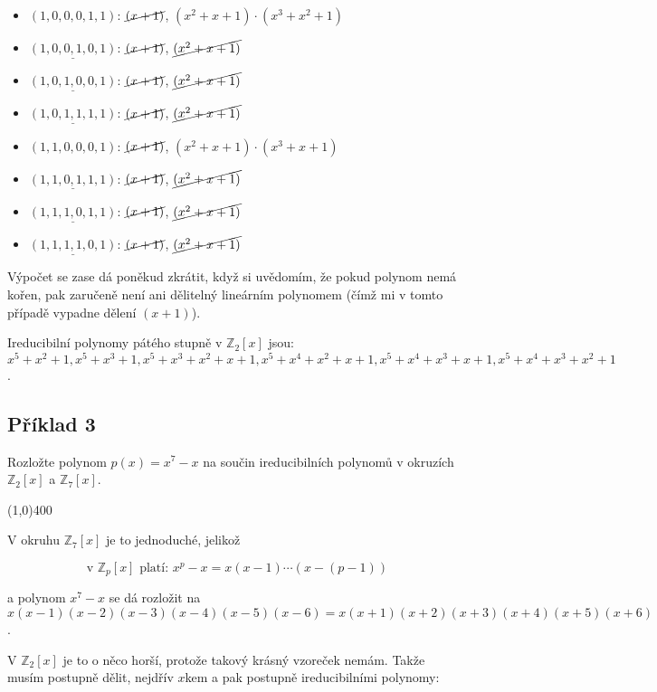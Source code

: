 \documentclass{article}
\begin{document}
\begin{itemize}
	\item $(1,0,0,0,1,1)$: $\cancel{(x+1)}$, $(x^2 + x + 1)\cdot(x^3 + x^2 + 1)$ 
	\item $\underline{(1,0,0,1,0,1)}$: $\cancel{(x+1)}$, $\cancel{(x^2 + x + 1)}$ 
	\item $\underline{(1,0,1,0,0,1)}$: $\cancel{(x+1)}$, $\cancel{(x^2 + x + 1)}$ 
	\item $\underline{(1,0,1,1,1,1)}$: $\cancel{(x+1)}$, $\cancel{(x^2 + x + 1)}$  
	\item $(1,1,0,0,0,1)$: $\cancel{(x+1)}$, $(x^2 + x + 1)\cdot(x^3 + x + 1)$ 
	\item $\underline{(1,1,0,1,1,1)}$: $\cancel{(x+1)}$, $\cancel{(x^2 + x + 1)}$  
	\item $\underline{(1,1,1,0,1,1)}$: $\cancel{(x+1)}$, $\cancel{(x^2 + x + 1)}$
	\item $\underline{(1,1,1,1,0,1)}$: $\cancel{(x+1)}$, $\cancel{(x^2 + x + 1)}$
\end{itemize}

Výpočet se zase dá poněkud zkrátit, když si uvědomím, že pokud polynom nemá kořen, pak zaručeně není ani dělitelný lineárním polynomem (čímž mi v tomto případě vypadne dělení $(x+1)$).

Ireducibilní polynomy pátého stupně v $\mathbb{Z}_2[x]$ jsou: $x^5 + x^2 + 1, x^5 + x^3 + 1, x^5 + x^3 + x^2 + x + 1, x^5 + x^4 + x^2 + x + 1, x^5 + x^4 + x^3  + x + 1, x^5 + x^4 + x^3 + x^2 + 1$.

\subsection{Příklad 3}
Rozložte polynom $p(x) = x^7 - x$ na součin ireducibilních polynomů v okruzích $\mathbb{Z}_2[x]$ a $\mathbb{Z}_7[x]$.

\line(1,0){400}

V okruhu $\mathbb{Z}_7[x]$ je to jednoduché, jelikož

\[ \mbox{ v } \mathbb{Z}_p[x]\mbox{ platí: } x^p - x = x (x-1) \cdots (x - (p-1)) \]

a polynom  $x^7 - x$ se dá rozložit na $x(x-1)(x-2)(x-3)(x-4)(x-5)(x-6) = x(x+1)(x+2)(x+3)(x+4)(x+5)(x+6)$. 

V $\mathbb{Z}_2[x]$ je to o něco horší, protože takový krásný vzoreček nemám. Takže musím postupně dělit, nejdřív $x$kem a pak postupně ireducibilními polynomy:
\end{document}
